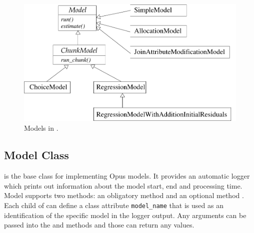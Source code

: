 {\begin{figure}
\begin{center}
\includegraphics[scale=0.8]{images/coremodelswithmethods.pdf}
\caption{\label{fig:opus-core-model}\small Models in .}
\end{center}
\end{figure}

\subsection{Model Class}
 is the base class for implementing Opus models. It provides an
automatic logger which prints out information about the model start, end and
processing time.  Model supports two methods: an obligatory method
 and an optional method . Each child of
 can define a class attribute \attributesindex \verb|model_name| that is used as
an identification of the specific model in the logger output. Any arguments
can be passed into the  and  methods and
those can return any values.

}
